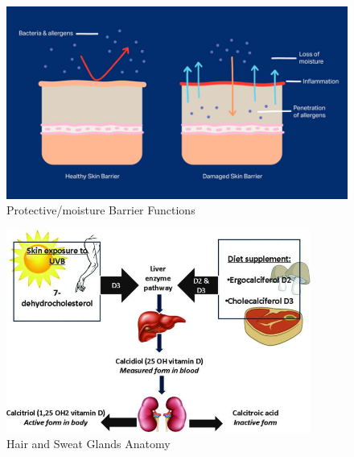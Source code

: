 \begin{figure}[htbp]
\begin{center}
\includegraphics[width=15cm]{./chapter-01-general-medical-information/protective-barrier.jpg}
\end{center}
\caption{Protective/moisture Barrier Functions ~\cite{protectiveBarrier}}
\label{fig:barrier}
\end{figure}
\begin{figure}[htbp]
\begin{center}
\includegraphics[width=10cm]{./chapter-01-general-medical-information/vitaminD.jpg}
\end{center}
\caption{Hair and Sweat Glands Anatomy ~\cite{vitaminD}}
\label{fig:vitaminD}
\end{figure}

